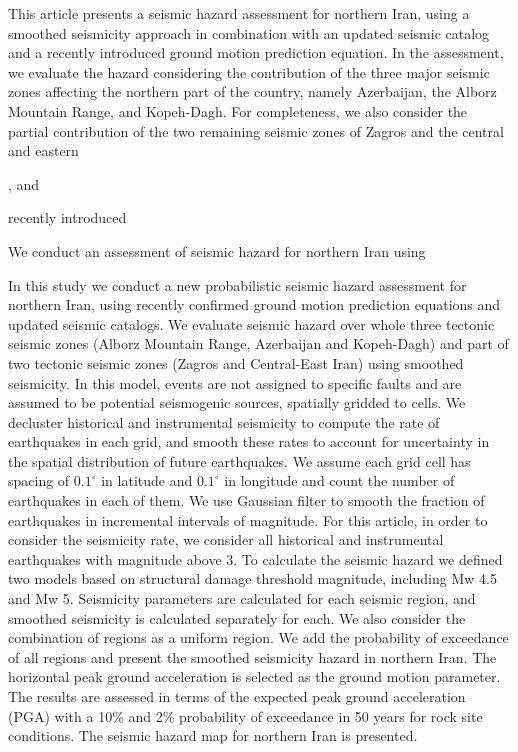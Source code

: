 % 
This article presents a seismic hazard assessment for northern Iran, using a smoothed seismicity approach in combination with an updated seismic catalog and a recently introduced ground motion prediction equation. In the assessment, we evaluate the hazard considering the contribution of the three major seismic zones affecting the northern part of the country, namely Azerbaijan, the Alborz Mountain Range, and Kopeh-Dagh. For completeness, we also consider the partial contribution of the two remaining seismic zones of Zagros and the central and eastern 



,  and 

recently introduced 

 We conduct an assessment of seismic hazard for northern Iran using 



In this study we conduct a new probabilistic seismic hazard assessment for northern Iran, using recently confirmed ground motion prediction equations and updated seismic catalogs. We evaluate seismic hazard over whole three tectonic seismic zones (Alborz Mountain Range, Azerbaijan and Kopeh-Dagh) and part of two tectonic seismic zones (Zagros and Central-East Iran) using smoothed seismicity. In this model, events are not assigned to specific faults and are assumed to be potential seismogenic sources, spatially gridded to cells. We decluster historical and instrumental seismicity to compute the rate of earthquakes in each grid, and smooth these rates to account for uncertainty in the spatial distribution of future earthquakes. We assume each grid cell has spacing of $0.1^{\circ}$ in latitude and $0.1^{\circ}$ in longitude and count the number of earthquakes in each of them. We use Gaussian filter to smooth the fraction of earthquakes in incremental intervals of magnitude. For this article, in order to consider the seismicity rate, we consider all historical and instrumental earthquakes with magnitude above 3. To calculate the seismic hazard we defined two models based on structural damage threshold magnitude, including Mw 4.5 and Mw 5. Seismicity parameters are calculated for each seismic region, and smoothed seismicity is calculated separately for each. We also consider the combination of regions as a uniform region.  We add the probability of exceedance of all regions and present the smoothed seismicity hazard in northern Iran. The horizontal peak ground acceleration is selected as the ground motion parameter. The results are assessed in terms of the expected peak ground acceleration (PGA) with a 10\% and 2\% probability of exceedance in 50 years for rock site conditions. The seismic hazard map for northern Iran is presented. 